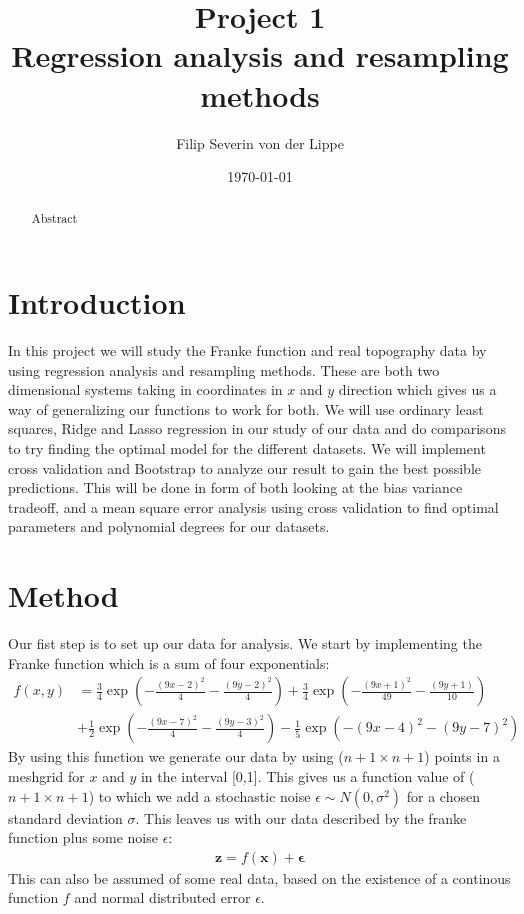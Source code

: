 \documentclass[12pt]{article}
\title{Project 1\\ Regression analysis and resampling methods}
\author{Filip Severin von der Lippe}
\date{\today}
\begin{document}
\maketitle
\begin{abstract}
  Abstract
\end{abstract}
\newpage
\tableofcontents
\section{Introduction}
In this project we will study the Franke function and real topography data by using regression analysis and resampling methods. These are both two dimensional systems taking in coordinates in $x$ and $y$ direction which gives us a way of generalizing our functions to work for both. We will use ordinary least squares, Ridge and Lasso regression in our study of our data and do comparisons to try finding the optimal model for the different datasets. We will implement cross validation and Bootstrap to analyze our result to gain the best possible predictions. This will be done in form of both looking at the bias variance tradeoff, and a mean square error analysis using cross validation to find optimal parameters and polynomial degrees for our datasets.

\section{Method}
Our fist step is to set up our data for analysis. We start by implementing the Franke function which is a sum of four exponentials:
\begin{align*}
  f(x,y) &= \frac{3}{4 }\exp\left(- \frac{(9x -2 )^2}{4} - \frac{(9y-2)^2}{4}\right) +\frac{3}{4}\exp{\left(-\frac{(9x+1)^2}{49}- \frac{(9y+1)}{10}\right)} \\
&+\frac{1}{2}\exp{\left(-\frac{(9x-7)^2}{4} - \frac{(9y-3)^2}{4}\right)} -\frac{1}{5}\exp{\left( -(9x-4)^2 - (9y-7)^2\right) }
\end{align*}
By using this function we generate our data by using ($n+1\times n+1$) points in a meshgrid for $x$ and $y$ in the interval [0,1]. This gives us a function value of ($n+1 \times n+1$) to which we add a stochastic noise $\epsilon \sim N(0,\sigma^2)$ for a chosen standard deviation $\sigma$. This leaves us with our data described by the franke function plus some noise $\epsilon$:
\begin{align*}
  \boldsymbol{z} = f(\boldsymbol{x}) + \boldsymbol{\epsilon}
\end{align*}
This can also be assumed of some real data, based on the existence of a continous function $f$ and normal distributed error $\epsilon$.
\end{document}
